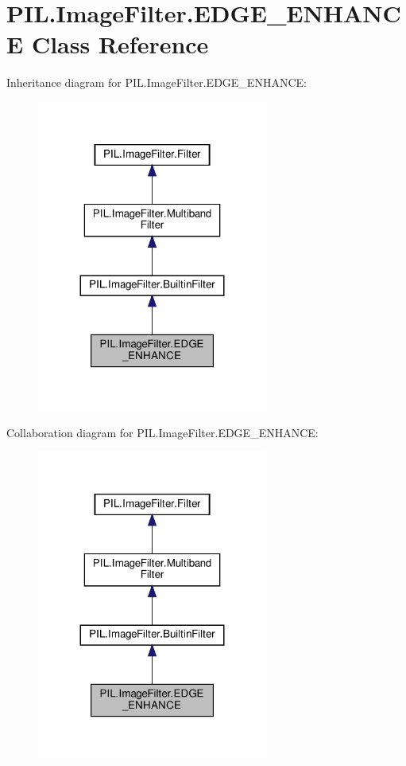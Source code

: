\hypertarget{classPIL_1_1ImageFilter_1_1EDGE__ENHANCE}{}\section{P\+I\+L.\+Image\+Filter.\+E\+D\+G\+E\+\_\+\+E\+N\+H\+A\+N\+CE Class Reference}
\label{classPIL_1_1ImageFilter_1_1EDGE__ENHANCE}


Inheritance diagram for P\+I\+L.\+Image\+Filter.\+E\+D\+G\+E\+\_\+\+E\+N\+H\+A\+N\+CE\+:
\nopagebreak
\begin{figure}[H]
\begin{center}
\leavevmode
\includegraphics[width=215pt]{classPIL_1_1ImageFilter_1_1EDGE__ENHANCE__inherit__graph}
\end{center}
\end{figure}


Collaboration diagram for P\+I\+L.\+Image\+Filter.\+E\+D\+G\+E\+\_\+\+E\+N\+H\+A\+N\+CE\+:
\nopagebreak
\begin{figure}[H]
\begin{center}
\leavevmode
\includegraphics[width=215pt]{classPIL_1_1ImageFilter_1_1EDGE__ENHANCE__coll__graph}
\end{center}
\end{figure}
